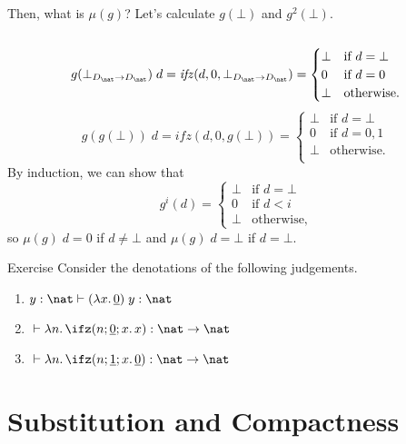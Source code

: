 \begin{frame}
  Then, what is $\mu(g)$? Let's calculate $g(\bot)$ and $g^2(\bot)$. 
  \\~\\
  \[
    g(\bot_{D_\nat \to D_\nat})\;d = \mathit{ifz}(d, 0, \bot_{D_\nat \to D_\nat}) = 
    \begin{cases}
      \bot & \text{if $d = \bot$} \\
      0 & \text{if $d = 0$} \\
      \bot & \text{otherwise.} \\
    \end{cases}
  \]
  \[
    g(g(\bot))\;d
    = \mathit{ifz}(d, 0, g(\bot))
    = 
    \begin{cases}
      \bot & \text{if $d = \bot$} \\
      0 & \text{if $d = 0, 1$} \\
      \bot & \text{otherwise.} \\
    \end{cases}
  \] 
  By induction, we can show that 
  \[
    g^i(d) = 
    \begin{cases}
      \bot & \text{if $d = \bot$} \\
      0 & \text{if $d < i$} \\
      \bot & \text{otherwise,}
    \end{cases}
  \]
  so $\mu(g)\;d= 0$ if $d \neq \bot$ and $\mu(g)\;d = \bot$ if $d = \bot$. 
\end{frame}

\begin{frame}
  \begin{block}{Exercise}
    Consider the denotations of the following judgements.
    \begin{enumerate}
      \item $y : \nat \vdash (\lambda x.\,\underline{0})\; y : \nat$
      \item ${}\vdash \lambda n.\,\ifz(n; \underline{0}; x.\, x) : \nat \to \nat$
      \item ${}\vdash \lambda n.\,\ifz(n; \underline{1}; x.\, \underline{0}) : \nat
          \to \nat$
      \end{enumerate}
  \end{block}
\end{frame}

\section{Substitution and Compactness}

